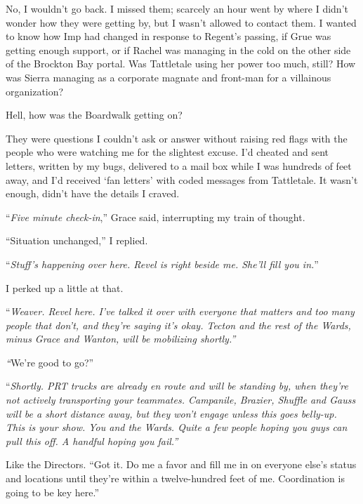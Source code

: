 No, I wouldn't go back.  I missed them; scarcely an hour went by where I didn't wonder how they were getting by, but I wasn't allowed to contact them.  I wanted to know how Imp had changed in response to Regent's passing, if Grue was getting enough support, or if Rachel was managing in the cold on the other side of the Brockton Bay portal.  Was Tattletale using her power too much, still?  How was Sierra managing as a corporate magnate and front-man for a villainous organization?



Hell, how was the Boardwalk getting on?



They were questions I couldn't ask or answer without raising red flags with the people who were watching me for the slightest excuse.  I'd cheated and sent letters, written by my bugs, delivered to a mail box while I was hundreds of feet away, and I'd received `fan letters' with coded messages from Tattletale.  It wasn't enough, didn't have the details I craved.



``\emph{Five minute check-in},'' Grace said, interrupting my train of thought.



``Situation unchanged,'' I replied.



``\emph{Stuff's happening over here.  Revel is right beside me.  She'll fill you in.}''



I perked up a little at that.



``\emph{Weaver.  Revel here.  I've talked it over with everyone that matters and too many people that don't, and they're saying it's okay.  Tecton and the rest of the Wards, minus Grace and Wanton, will be mobilizing shortly.''}



\emph{``}We're good to go?''



``\emph{Shortly.  PRT trucks are already en route and will be standing by, when they're not actively transporting your teammates.  Campanile, Brazier, Shuffle and Gauss will be a short distance away, but they won't engage unless this goes belly-up.  This is your show.  You and the Wards.  Quite a few people hoping you guys can pull this off.  A handful hoping you fail.''}



Like the Directors.  ``Got it.  Do me a favor and fill me in on everyone else's status and locations until they're within a twelve-hundred feet of me.  Coordination is going to be key here.''



